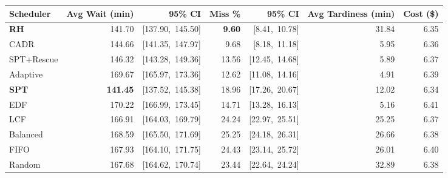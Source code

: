 \begin{tabular}{lrrrrrr}
\toprule
\textbf{Scheduler} & \textbf{Avg Wait (min)} & \textbf{95\% CI} & \textbf{Miss \%} & \textbf{95\% CI} & \textbf{Avg Tardiness (min)} & \textbf{Cost (\$)} \\
\midrule
\textbf{RH} & 141.70 & [137.90,~145.50] & \textbf{9.60} & [8.41,~10.78] & 31.84 & 6.35\\
CADR & 144.66 & [141.35,~147.97] & 9.68 & [8.18,~11.18] & 5.95 & 6.36\\
SPT+Rescue & 146.32 & [143.28,~149.36] & 13.56 & [12.45,~14.68] & 5.89 & 6.37\\
Adaptive & 169.67 & [165.97,~173.36] & 12.62 & [11.08,~14.16] & 4.91 & 6.39\\
\textbf{SPT} & \textbf{141.45} & [137.52,~145.38] & 18.96 & [17.26,~20.67] & 12.02 & 6.34\\
EDF & 170.22 & [166.99,~173.45] & 14.71 & [13.28,~16.13] & 5.16 & 6.41\\
LCF & 166.91 & [164.03,~169.79] & 24.24 & [22.97,~25.51] & 25.25 & 6.37\\
Balanced & 168.59 & [165.50,~171.69] & 25.25 & [24.18,~26.31] & 26.66 & 6.38\\
FIFO & 167.93 & [164.10,~171.75] & 24.43 & [23.14,~25.72] & 26.01 & 6.40\\
Random & 167.68 & [164.62,~170.74] & 23.44 & [22.64,~24.24] & 32.89 & 6.38\\
\bottomrule
\end{tabular}
